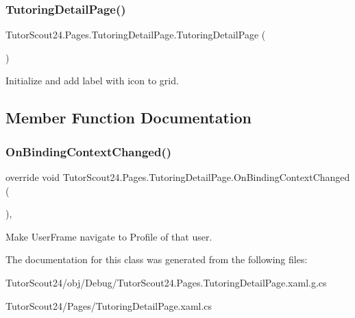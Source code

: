 \subsubsection{\texorpdfstring{Tutoring\+Detail\+Page()}{TutoringDetailPage()}}
{\footnotesize\ttfamily Tutor\+Scout24.\+Pages.\+Tutoring\+Detail\+Page.\+Tutoring\+Detail\+Page (\begin{DoxyParamCaption}{ }\end{DoxyParamCaption})\hspace{0.3cm}{\ttfamily [inline]}}



Initialize and add label with icon to grid. 



\subsection{Member Function Documentation}
\mbox{\label{class_tutor_scout24_1_1_pages_1_1_tutoring_detail_page_a8c88fad51bcb6cf222b860c1a3949a5e}} 
\subsubsection{\texorpdfstring{On\+Binding\+Context\+Changed()}{OnBindingContextChanged()}}
{\footnotesize\ttfamily override void Tutor\+Scout24.\+Pages.\+Tutoring\+Detail\+Page.\+On\+Binding\+Context\+Changed (\begin{DoxyParamCaption}{ }\end{DoxyParamCaption})\hspace{0.3cm}{\ttfamily [inline]}, {\ttfamily [protected]}}



Make User\+Frame navigate to Profile of that user. 



The documentation for this class was generated from the following files\+:\begin{DoxyCompactItemize}
\item 
Tutor\+Scout24/obj/\+Debug/Tutor\+Scout24.\+Pages.\+Tutoring\+Detail\+Page.\+xaml.\+g.\+cs\item 
Tutor\+Scout24/\+Pages/Tutoring\+Detail\+Page.\+xaml.\+cs\end{DoxyCompactItemize}
